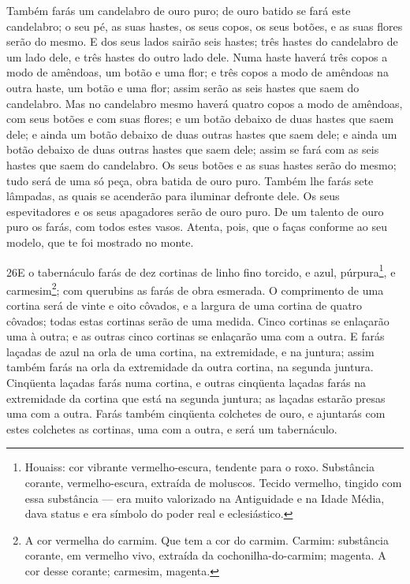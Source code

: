 Também farás um candelabro de ouro puro; de ouro batido se fará
este candelabro; o seu pé, as suas hastes, os seus copos, os seus
botões, e as suas flores serão do mesmo. E dos seus lados
sairão seis hastes; três hastes do candelabro de um lado dele, e
três hastes do outro lado dele. Numa haste haverá três copos
a modo de amêndoas, um botão e uma flor; e três copos a modo de
amêndoas na outra haste, um botão e uma flor; assim serão as seis
hastes que saem do candelabro. Mas no candelabro mesmo haverá
quatro copos a modo de amêndoas, com seus botões e com suas flores;
e um botão debaixo de duas hastes que saem dele; e ainda um
botão debaixo de duas outras hastes que saem dele; e ainda um botão
debaixo de duas outras hastes que saem dele; assim se fará com as
seis hastes que saem do candelabro. Os seus botões e as suas
hastes serão do mesmo; tudo será de uma só peça, obra batida de ouro
puro. Também lhe farás sete lâmpadas, as quais se acenderão
para iluminar defronte dele. Os seus espevitadores e os seus
apagadores serão de ouro puro. De um talento de ouro puro os
farás, com todos estes vasos. Atenta, pois, que o faças
conforme ao seu modelo, que te foi mostrado no monte.

\medskip

\lettrine{26} E o tabernáculo farás de dez cortinas de linho
fino torcido, e azul, púrpura\footnote{Houaiss: cor vibrante
vermelho-escura, tendente para o roxo. Substância corante,
vermelho-escura, extraída de moluscos. Tecido vermelho, tingido com
essa substância --- era muito valorizado na Antiguidade e na Idade
Média, dava status e era símbolo do poder real e eclesiástico.}, e
carmesim\footnote{A cor vermelha do carmim. Que tem a cor do carmim.
Carmim: substância corante, em vermelho vivo, extraída da
cochonilha-do-carmim; magenta. A cor desse corante; carmesim,
magenta.}; com querubins as farás de obra esmerada. O
comprimento de uma cortina será de vinte e oito côvados, e a largura
de uma cortina de quatro côvados; todas estas cortinas serão de uma
medida. Cinco cortinas se enlaçarão uma à outra; e as outras
cinco cortinas se enlaçarão uma com a outra. E farás laçadas de
azul na orla de uma cortina, na extremidade, e na juntura; assim
também farás na orla da extremidade da outra cortina, na segunda
juntura. Cinqüenta laçadas farás numa cortina, e outras
cinqüenta laçadas farás na extremidade da cortina que está na
segunda juntura; as laçadas estarão presas uma com a outra.
Farás também cinqüenta colchetes de ouro, e ajuntarás com estes
colchetes as cortinas, uma com a outra, e será um tabernáculo.

